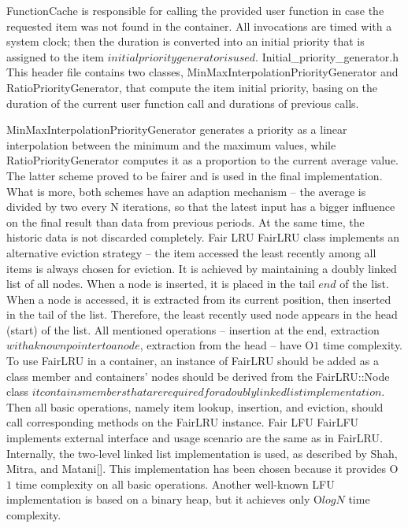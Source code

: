 FunctionCache is responsible for calling the provided user function in case the requested item was not found in the container. All invocations are timed with a system clock; then the duration is converted into an initial priority that is assigned to the item \(initial priority generator is used\).
Initial\_priority\_generator.h
This header file contains two classes, MinMaxInterpolationPriorityGenerator and RatioPriorityGenerator, that compute the item initial priority, basing on the duration of the current user function call and durations of previous calls.

MinMaxInterpolationPriorityGenerator generates a priority as a linear interpolation between the minimum and the maximum values, while RatioPriorityGenerator computes it as a proportion to the current average value. The latter scheme proved to be fairer and is used in the final implementation. What is more, both schemes have an adaption mechanism – the average is divided by two every N iterations, so that the latest input has a bigger influence on the final result than data from previous periods. At the same time, the historic data is not discarded completely.
Fair LRU
FairLRU class implements an alternative eviction strategy – the item accessed the least recently among all items is always chosen for eviction. It is achieved by maintaining a doubly linked list of all nodes. When a node is inserted, it is placed in the tail \(end\) of the list. When a node is accessed, it is extracted from its current position, then inserted in the tail of the list. Therefore, the least recently used node appears in the head (start) of the list. All mentioned operations – insertion at the end, extraction \(with a known pointer to a node\), extraction from the head – have O\(1\) time complexity.
To use FairLRU in a container, an instance of FairLRU should be added as a class member and containers’ nodes should be derived from the FairLRU::Node class \(it contains members that are required for a doubly linked list implementation\). Then all basic operations, namely item lookup, insertion, and eviction, should call corresponding methods on the FairLRU instance.
Fair LFU
FairLFU implements external interface and usage scenario are the same as in FairLRU. Internally, the two-level linked list implementation is used, as described by Shah, Mitra, and Matani[]. This implementation has been chosen because it provides O\(1\) time complexity on all basic operations. Another well-known LFU implementation is based on a binary heap, but it achieves only O\(log N\) time complexity.

